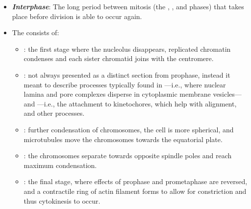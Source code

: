 \begin{itemize}
  \item \emph{\textbf{Interphase}}: The long period between mitosis (the , , and  phases) that takes place before division is able to occur again.
  \item The  consists of: 
    \begin{itemize}
      \item {}: the first stage where the nucleolus disappears, replicated chromatin condenses and each sister chromatid joins with the centromere. 
      \item {}: not always presented as a distinct section from prophase, instead it meant to describe processes typically found in ---i.e., where nuclear lamina and pore complexes disperse in cytoplasmic membrane vesicles---and ---i.e., the attachment to kinetochores, which help with alignment, and other processes.
      \item {}: further condensation of chromosomes, the cell is more spherical, and microtubules move the chromosomes towards the equatorial plate.
      \item {}: the chromosomes separate towards opposite spindle poles and reach maximum condensation.
      \item {}: the final stage, where effects of prophase and prometaphase are reversed, and a contractile ring of actin filament forms to allow for constriction and thus cytokinesis to occur.
    \end{itemize}
\end{itemize}

\newpage
